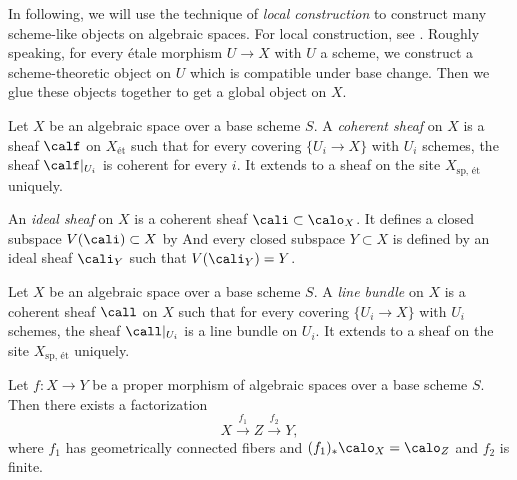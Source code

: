     In following, we will use the technique of \emph{local construction} to construct many scheme-like objects on algebraic spaces.
    For local construction, see \cite{Knu71}.
    Roughly speaking, for every \'etale morphism \(U \to X\) with \(U\) a scheme, we construct a scheme-theoretic object on \(U\) which is compatible under base change.
    Then we glue these objects together to get a global object on \(X\).

    \begin{definition}\label{def:coherent_sheaf_on_algebraic_space}
        Let \(X\) be an algebraic space over a base scheme \(S\).
        A \emph{coherent sheaf} on \(X\) is a sheaf \(\calf\) on \(X_{\text{\'et}}\) such that for every covering \(\{U_i \to X\}\) with \(U_i\) schemes, the sheaf \(\calf|_{U_i}\) is coherent for every \(i\).
        It extends to a sheaf on the site \(X_{\text{sp, \'et}}\) uniquely.

        An \emph{ideal sheaf} on \(X\) is a coherent sheaf \(\cali \subset \calo_X\).
        It defines a closed subspace \(V(\cali) \subset X\) by 
        And every closed subspace \(Y \subset X\) is defined by an ideal sheaf \(\cali_Y\) such that \(V(\cali_Y) = Y\).
    \end{definition}

    \begin{definition}\label{def:line_bundles_and_divisors_on_algebraic_space}
        Let \(X\) be an algebraic space over a base scheme \(S\).
        A \emph{line bundle} on \(X\) is a coherent sheaf \(\call\) on \(X\) such that for every covering \(\{U_i \to X\}\) with \(U_i\) schemes, the sheaf \(\call|_{U_i}\) is a line bundle on \(U_i\).
        It extends to a sheaf on the site \(X_{\text{sp, \'et}}\) uniquely.
    \end{definition}



    \begin{theorem}\label{thm:Stein_factorization_for_algebraic_space}
        Let \(f: X \to Y\) be a proper morphism of algebraic spaces over a base scheme \(S\).
        Then there exists a factorization 
        \[ X \xrightarrow{f_1} Z \xrightarrow{f_2} Y, \]
        where \(f_1\) has geometrically connected fibers and \((f_1)_*\calo_X = \calo_Z\) and \(f_2\) is finite.
    \end{theorem}

